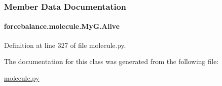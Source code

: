 \subsubsection{Member Data Documentation}
\hypertarget{classforcebalance_1_1molecule_1_1MyG_ad6a5334dbe95ecab760c2d76ec8610ea}{
\paragraph[{Alive}]{\setlength{\rightskip}{0pt plus 5cm}forcebalance.\-molecule.\-My\-G.\-Alive}}\label{classforcebalance_1_1molecule_1_1MyG_ad6a5334dbe95ecab760c2d76ec8610ea}


Definition at line 327 of file molecule.\-py.



The documentation for this class was generated from the following file\-:\begin{DoxyCompactItemize}
\item 
\hyperlink{molecule_8py}{molecule.\-py}\end{DoxyCompactItemize}
